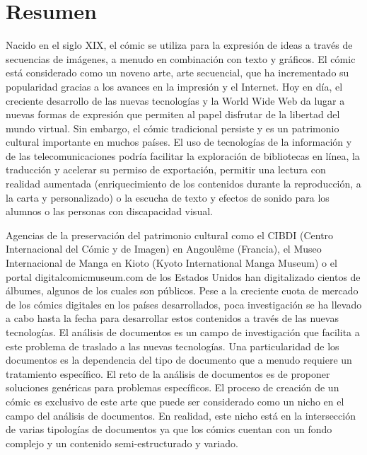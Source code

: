 \chapter*{Resumen}

Nacido en el siglo XIX, el cómic se utiliza para la expresión de ideas a través de secuencias de imágenes, a menudo en combinación con texto y gráficos. 
El cómic está considerado como un noveno arte, arte secuencial, que ha incrementado su popularidad gracias a los avances en la impresión y el Internet.
Hoy en día, el creciente desarrollo de las nuevas tecnologías y la World Wide Web da lugar a nuevas formas de expresión que permiten al papel disfrutar de la libertad del mundo virtual.
Sin embargo, el cómic tradicional persiste y es un patrimonio cultural importante en muchos países.
El uso de tecnologías de la información y de las telecomunicaciones podría facilitar la exploración de bibliotecas en línea, la traducción y acelerar su permiso de exportación, permitir una lectura con realidad aumentada (enriquecimiento de los contenidos durante la reproducción, a la carta y personalizado) o la escucha de texto y efectos de sonido para los alumnos o las personas con discapacidad visual.

Agencias de la preservación del patrimonio cultural como el CIBDI (Centro Internacional del Cómic y de Imagen) en Angoulême (Francia), el Museo Internacional de Manga en Kioto (Kyoto International Manga Museum) o el portal digitalcomicmuseum.com de los Estados Unidos han digitalizado cientos de álbumes, algunos de los cuales son públicos.
Pese a la creciente cuota de mercado de los cómics digitales en los países desarrollados, poca investigación se ha llevado a cabo hasta la fecha para desarrollar estos contenidos a través de las nuevas tecnologías.
El análisis de documentos es un campo de investigación que facilita a este problema de traslado a las nuevas tecnologías.
Una particularidad de los documentos es la dependencia del tipo de documento que a menudo requiere un tratamiento específico.
El reto de la análisis de documentos es de proponer soluciones genéricas para problemas específicos.
El proceso de creación de un cómic es exclusivo de este arte que puede ser considerado como un nicho en el campo del análisis de documentos.
En realidad, este nicho está en la intersección de varias tipologías de documentos ya que los cómics cuentan con un fondo complejo y un contenido semi-estructurado y variado.

